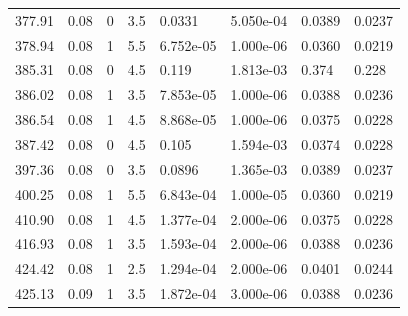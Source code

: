 \documentclass[preview]{standalone}
\begin{document}
{{{\begin{tabular}{L{1.2cm}C{1.2cm} C{0.3cm}C{0.5cm} C{1.4cm}C{1.4cm} C{1.4cm}C{1.4cm}}
  377.91  &  0.08  & 0     & 3.5 &  0.0331  & 5.050e-04  & 0.0389 &  0.0237   \\ 
  378.94  &  0.08  & 1     & 5.5 &  6.752e-05  & 1.000e-06  & 0.0360 &  0.0219   \\ 
  385.31  &  0.08  & 0     & 4.5 &  0.119  & 1.813e-03  & 0.374 &  0.228   \\ 
  386.02  &  0.08  & 1     & 3.5 &  7.853e-05  & 1.000e-06  & 0.0388 &  0.0236   \\ 
  386.54  &  0.08  & 1     & 4.5 &  8.868e-05  & 1.000e-06  & 0.0375 &  0.0228   \\ 
  387.42  &  0.08  & 0     & 4.5 &  0.105  & 1.594e-03  & 0.0374 &  0.0228   \\ 
  397.36  &  0.08  & 0     & 3.5 &  0.0896  & 1.365e-03  & 0.0389 &  0.0237   \\ 
  400.25  &  0.08  & 1     & 5.5 &  6.843e-04  & 1.000e-05  & 0.0360 &  0.0219   \\ 
  410.90  &  0.08  & 1     & 4.5 &  1.377e-04  & 2.000e-06  & 0.0375 &  0.0228   \\ 
  416.93  &  0.08  & 1     & 3.5 &  1.593e-04  & 2.000e-06  & 0.0388 &  0.0236   \\ 
  424.42  &  0.08  & 1     & 2.5 &  1.294e-04  & 2.000e-06  & 0.0401 &  0.0244   \\ 
  425.13  &  0.09  & 1     & 3.5 &  1.872e-04  & 3.000e-06  & 0.0388 &  0.0236   \\ 
\hline 
\end{tabular} 

}}}
\end{document}
